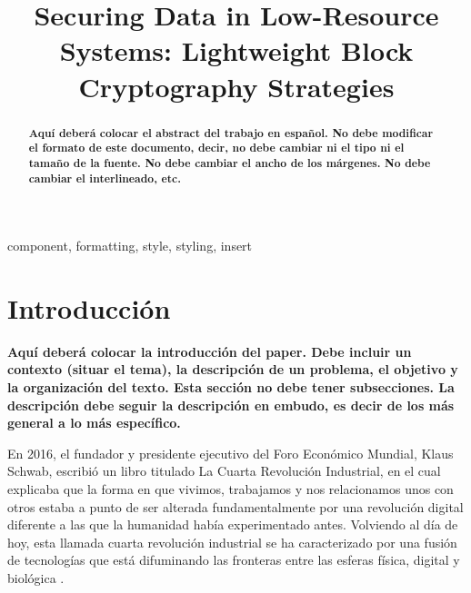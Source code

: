 \documentclass[conference]{IEEEtran}
\begin{document}
\title{Securing Data in Low-Resource Systems: Lightweight Block Cryptography Strategies}


\author{
\and
{}
}


\maketitle

\begin{abstract}

\textbf{Aquí deberá colocar el abstract del trabajo en español.
No debe modificar el formato de este documento, decir, no debe cambiar ni el tipo ni el tamaño de la fuente. No debe cambiar el ancho de los márgenes. No debe cambiar el interlineado, etc.}

\end{abstract}

\begin{IEEEkeywords}
component, formatting, style, styling, insert
\end{IEEEkeywords}

\section{Introducción}
\textbf{Aquí deberá colocar la introducción del paper. Debe incluir un contexto (situar el tema), la descripción de un problema, el objetivo y la organización del texto. Esta sección no debe tener subsecciones. La descripción debe seguir la descripción en embudo, es decir de los más general a lo más específico.}

En 2016, el fundador y presidente ejecutivo del Foro Económico Mundial, Klaus Schwab, escribió un libro titulado La Cuarta Revolución Industrial, en el cual explicaba que la forma en que vivimos, trabajamos y nos relacionamos unos con otros estaba a punto de ser alterada fundamentalmente por una revolución digital diferente a las que la humanidad había experimentado antes. Volviendo al día de hoy, esta llamada cuarta revolución industrial se ha caracterizado por una fusión de tecnologías que está difuminando las fronteras entre las esferas física, digital y biológica \cite{WorldEconomicForum}.
\end{document}
